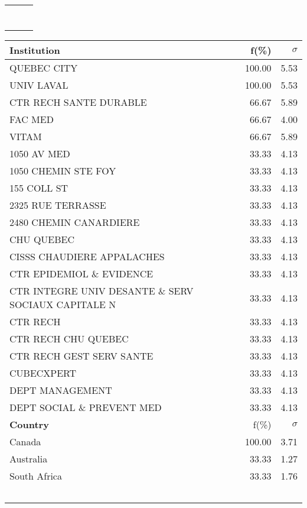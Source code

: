 \documentclass[a4paper,11pt]{report}
\begin{document}
\begin{landscape}
\begin{table}[!ht]
{\begin{tabular}{|p{5cm} r r|}
 &  & \\
 &  & \\
 &  & \\
 &  & \\
 &  & \\
 &  & \\
 &  & \\
\hline
\end{tabular}
}
{\scriptsize\begin{tabular}{|p{5cm} r r|}
\hline
{\bf Institution }& f(\%) & $\sigma$\\
\hline
QUEBEC CITY & 100.00 & 5.53\\
UNIV LAVAL & 100.00 & 5.53\\
CTR RECH SANTE DURABLE & 66.67 & 5.89\\
FAC MED & 66.67 & 4.00\\
VITAM & 66.67 & 5.89\\
1050 AV MED & 33.33 & 4.13\\
1050 CHEMIN STE FOY & 33.33 & 4.13\\
155 COLL ST & 33.33 & 4.13\\
2325 RUE TERRASSE & 33.33 & 4.13\\
2480 CHEMIN CANARDIERE & 33.33 & 4.13\\
CHU QUEBEC & 33.33 & 4.13\\
CISSS CHAUDIERE APPALACHES & 33.33 & 4.13\\
CTR EPIDEMIOL \& EVIDENCE & 33.33 & 4.13\\
CTR INTEGRE UNIV DESANTE \& SERV SOCIAUX CAPITALE N & 33.33 & 4.13\\
CTR RECH & 33.33 & 4.13\\
CTR RECH CHU QUEBEC & 33.33 & 4.13\\
CTR RECH GEST SERV SANTE & 33.33 & 4.13\\
CUBECXPERT & 33.33 & 4.13\\
DEPT MANAGEMENT & 33.33 & 4.13\\
DEPT SOCIAL \& PREVENT MED & 33.33 & 4.13\\
\hline
{\bf Country }& f(\%) & $\sigma$\\
\hline
Canada & 100.00 & 3.71\\
Australia & 33.33 & 1.27\\
South Africa & 33.33 & 1.76\\
 &  & \\
 &  & \\
 &  & \\
 &  & \\
 &  & \\

\end{tabular}}
\end{table}
\end{landscape}
\end{document}
